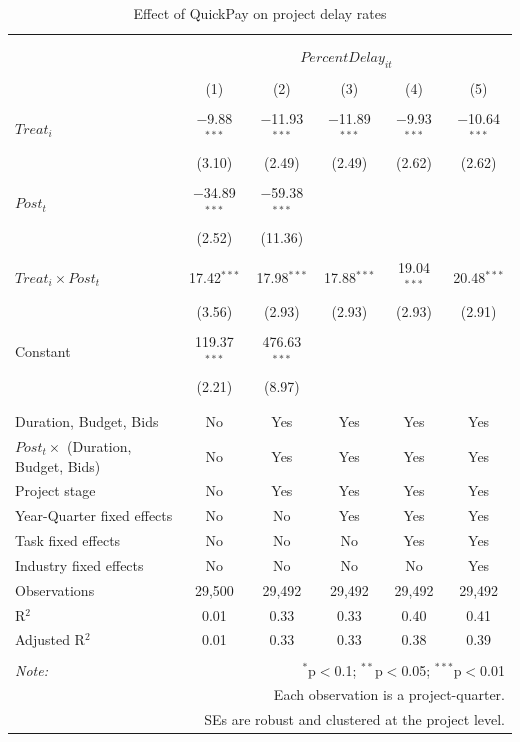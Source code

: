 \documentclass[
]{article}
\begin{document}
\begin{table}[H] \centering 
  \caption{Effect of QuickPay on project delay rates} 
  \label{} 
\small 
\begin{tabular}{@{\extracolsep{-2pt}}lccccc} 
\\[-1.8ex]\hline 
\hline \\[-1.8ex] 
\\[-1.8ex] & \multicolumn{5}{c}{$PercentDelay_{it}$} \\ 
\\[-1.8ex] & (1) & (2) & (3) & (4) & (5)\\ 
\hline \\[-1.8ex] 
 $Treat_i$ & $-$9.88$^{***}$ & $-$11.93$^{***}$ & $-$11.89$^{***}$ & $-$9.93$^{***}$ & $-$10.64$^{***}$ \\ 
  & (3.10) & (2.49) & (2.49) & (2.62) & (2.62) \\ 
  & & & & & \\ 
 $Post_t$ & $-$34.89$^{***}$ & $-$59.38$^{***}$ &  &  &  \\ 
  & (2.52) & (11.36) &  &  &  \\ 
  & & & & & \\ 
 $Treat_i \times Post_t$ & 17.42$^{***}$ & 17.98$^{***}$ & 17.88$^{***}$ & 19.04$^{***}$ & 20.48$^{***}$ \\ 
  & (3.56) & (2.93) & (2.93) & (2.93) & (2.91) \\ 
  & & & & & \\ 
 Constant & 119.37$^{***}$ & 476.63$^{***}$ &  &  &  \\ 
  & (2.21) & (8.97) &  &  &  \\ 
  & & & & & \\ 
\hline \\[-1.8ex] 
Duration, Budget, Bids & No & Yes & Yes & Yes & Yes \\ 
$Post_t \times$  (Duration, Budget, Bids) & No & Yes & Yes & Yes & Yes \\ 
Project stage & No & Yes & Yes & Yes & Yes \\ 
Year-Quarter fixed effects & No & No & Yes & Yes & Yes \\ 
Task fixed effects & No & No & No & Yes & Yes \\ 
Industry fixed effects & No & No & No & No & Yes \\ 
Observations & 29,500 & 29,492 & 29,492 & 29,492 & 29,492 \\ 
R$^{2}$ & 0.01 & 0.33 & 0.33 & 0.40 & 0.41 \\ 
Adjusted R$^{2}$ & 0.01 & 0.33 & 0.33 & 0.38 & 0.39 \\ 
\hline 
\hline \\[-1.8ex] 
\textit{Note:}  & \multicolumn{5}{r}{$^{*}$p$<$0.1; $^{**}$p$<$0.05; $^{***}$p$<$0.01} \\ 
 & \multicolumn{5}{r}{Each observation is a project-quarter.} \\ 
 & \multicolumn{5}{r}{SEs are robust and clustered at the project level.} \\ 
\end{tabular} 
\end{table}
\end{document}

